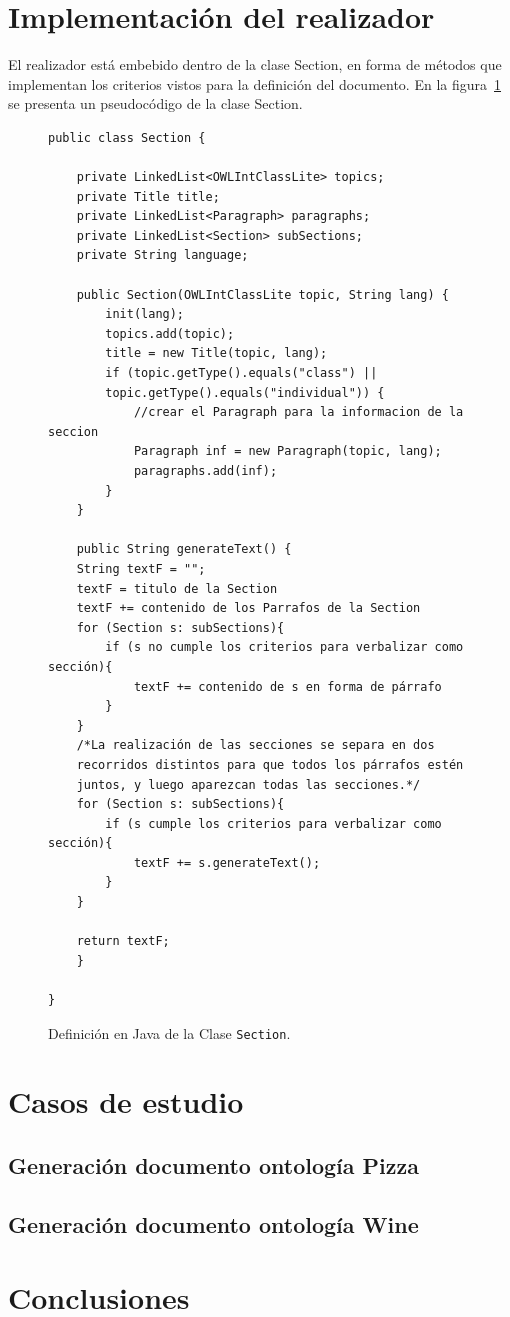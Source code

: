 \section{Implementación del realizador}
El realizador está embebido dentro de la clase Section, en forma de métodos que implementan los criterios vistos para la definición del documento. En la figura~\ref{fig:clase_section} se presenta un pseudocódigo de la clase Section.

\begin{figure}
\begin{verbatim}
public class Section {

    private LinkedList<OWLIntClassLite> topics;
    private Title title;
    private LinkedList<Paragraph> paragraphs;
    private LinkedList<Section> subSections;
    private String language;

    public Section(OWLIntClassLite topic, String lang) {
        init(lang);
        topics.add(topic);
        title = new Title(topic, lang);
        if (topic.getType().equals("class") ||
        topic.getType().equals("individual")) {
            //crear el Paragraph para la informacion de la seccion
            Paragraph inf = new Paragraph(topic, lang);
            paragraphs.add(inf);
        } 
    }
    
    public String generateText() {
    String textF = "";
    textF = titulo de la Section
    textF += contenido de los Parrafos de la Section
    for (Section s: subSections){
        if (s no cumple los criterios para verbalizar como sección){
            textF += contenido de s en forma de párrafo
        }
    }
    /*La realización de las secciones se separa en dos
    recorridos distintos para que todos los párrafos estén
    juntos, y luego aparezcan todas las secciones.*/
    for (Section s: subSections){
        if (s cumple los criterios para verbalizar como sección){
            textF += s.generateText();
        }
    }
    
    return textF;
    }
    
}
\end{verbatim}
\caption{Definición en Java de la Clase \texttt{Section}.}
\label{fig:clase_section}
\end{figure}


\section{Casos de estudio}

\subsection{Generación documento ontología Pizza}

\subsection{Generación documento ontología Wine}

\section{Conclusiones}

